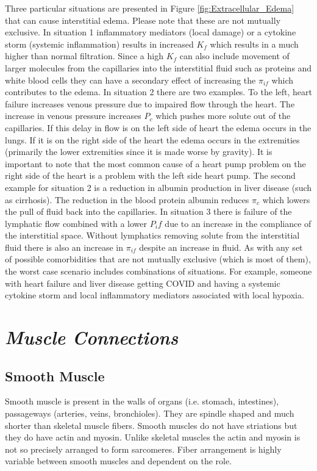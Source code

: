Three particular situations are presented in Figure \ref{fig:Extracellular_Edema} that can cause interstitial edema. Please note that these are not mutually exclusive. 
In situation 1 inflammatory mediators (local damage) or a cytokine storm (systemic inflammation) results in increased $K_f$ which results in a much higher than normal filtration. Since a high $K_f$ can also include movement of larger molecules from the capillaries into the interstitial fluid such as proteins and white blood cells they can have a secondary effect of increasing the $\pi_{if}$ which contributes to the edema. 
In situation 2 there are two examples. To the left, heart failure increases venous pressure due to impaired flow through the heart. The increase in venous pressure increases $P_c$ which pushes more solute out of the capillaries. If this delay in flow is on the left side of heart the edema occurs in the lungs. If it is on the right side of the heart the edema occurs in the extremities (primarily the lower extremities since it is made worse by gravity). It is important to note that the most common cause of a heart pump problem on the right side of the heart is a problem with the left side heart pump. The second example for situation 2 is a reduction in albumin production in liver disease (such as cirrhosis). The reduction in the blood protein albumin reduces $\pi_c$ which lowers the pull of fluid back into the capillaries.
In situation 3 there is failure of the lymphatic flow combined with a lower $P_if$ due to an increase in the compliance of the interstitial space. Without lymphatics removing solute from the interstitial fluid there is also an increase in $\pi_{if}$ despite an increase in fluid.
As with any set of possible comorbidities that are not mutually exclusive (which is most of them), the worst case scenario includes combinations of situations. For example, someone with heart failure and liver disease getting COVID and having a systemic cytokine storm and local inflammatory mediators associated with local hypoxia. 

\section{\textit{Muscle Connections}}

\subsection{Smooth Muscle}

Smooth muscle is present in the walls of organs (i.e. stomach, intestines), passageways (arteries, veins, bronchioles). They are spindle shaped and much shorter than skeletal muscle fibers. Smooth muscles do not have striations but they do have actin and myosin. Unlike skeletal muscles the actin and myosin is not so precisely arranged to form sarcomeres. Fiber arrangement is highly variable between smooth muscles and dependent on the role. 

